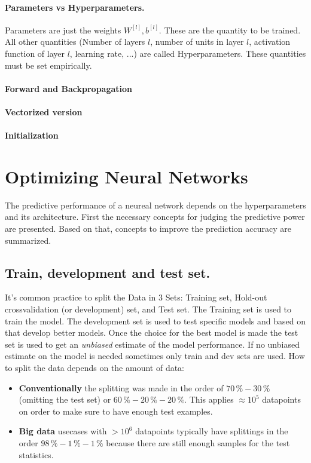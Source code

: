 \documentclass[12pt,a4paper]{article}
\begin{document}
\paragraph{Parameters vs Hyperparameters.} Parameters are just the weights $W^{[l]}, b^{[l]}$. These are the quantity to be trained. All other quantities (Number of layers $l$, number of units in layer $l$, activation function of layer $l$, learning rate, ...) are called Hyperparameters.  These quantities must be set empirically.
\paragraph{Forward and Backpropagation}
\paragraph{Vectorized version}
\paragraph{Initialization}

\section{Optimizing Neural Networks}
The predictive performance  of a neureal network depends on the hyperparameters and its architecture. First the necessary concepts for judging the predictive power are presented. Based on that, concepts to improve the prediction accuracy are summarized.
\subsection{Train, development and test set.}
It's common practice to split the Data in 3 Sets: Training set, Hold-out crossvalidation (or development) set, and Test set. The Training set is used to train the model. The development set is used to test specific models and based on that develop better models. Once the choice for the best model is made the test set is used to get an \emph{unbiased} estimate of the model performance. If no unbiased estimate on the model is needed sometimes only train and dev sets are used. How to split the data depends on the amount of data:
\begin{itemize}
	\item \textbf{Conventionally} the splitting was made in the order of $70\,\%  - 30 \,\%$  (omitting the test set) or $60\,\% - 20 \,\% - 20\,\%$. This applies $\approx 10^5$ datapoints on order to make sure to have enough test examples.
	\item \textbf{Big data} usecases with $> 10^6$ datapoints typically have splittings in the order $98\,\% - 1 \,\% - 1 \,\%$  because there are still enough samples for the test statistics.
\end{itemize}
\end{document}
